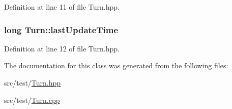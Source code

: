 Definition at line 11 of file Turn.\-hpp.

\hypertarget{classTurn_aea10c7359bfbeab45fea812356caae6b}{
\subsubsection[{last\-Update\-Time}]{\setlength{\rightskip}{0pt plus 5cm}long Turn\-::last\-Update\-Time\hspace{0.3cm}{\ttfamily [private]}}}\label{classTurn_aea10c7359bfbeab45fea812356caae6b}


Definition at line 12 of file Turn.\-hpp.



The documentation for this class was generated from the following files\-:\begin{DoxyCompactItemize}
\item 
src/test/\hyperlink{Turn_8hpp}{Turn.\-hpp}\item 
src/test/\hyperlink{Turn_8cpp}{Turn.\-cpp}\end{DoxyCompactItemize}
